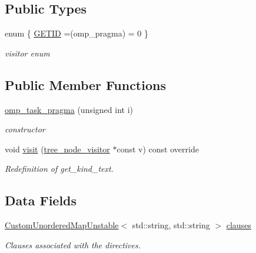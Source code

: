 \subsection*{Public Types}
\begin{DoxyCompactItemize}
\item 
enum \{ \hyperlink{structomp__task__pragma_a8ec24e09afe0ec62f8bfd7be080eebd5a942964266ed950c2659db67c807ab712}{G\+E\+T\+ID} =(omp\+\_\+pragma) = 0
 \}\begin{DoxyCompactList}\small\item\em visitor enum \end{DoxyCompactList}
\end{DoxyCompactItemize}
\subsection*{Public Member Functions}
\begin{DoxyCompactItemize}
\item 
\hyperlink{structomp__task__pragma_a7dc6713b8c01f0a80a90c083e3fe154a}{omp\+\_\+task\+\_\+pragma} (unsigned int i)
\begin{DoxyCompactList}\small\item\em constructor \end{DoxyCompactList}\item 
void \hyperlink{structomp__task__pragma_ad7ce2ba5852e3a4404ef8dad6c6034be}{visit} (\hyperlink{classtree__node__visitor}{tree\+\_\+node\+\_\+visitor} $\ast$const v) const override
\begin{DoxyCompactList}\small\item\em Redefinition of get\+\_\+kind\+\_\+text. \end{DoxyCompactList}\end{DoxyCompactItemize}
\subsection*{Data Fields}
\begin{DoxyCompactItemize}
\item 
\hyperlink{custom__map_8hpp_a8cbaceffc09790a885ec7e9c17809c69}{Custom\+Unordered\+Map\+Unstable}$<$ std\+::string, std\+::string $>$ \hyperlink{structomp__task__pragma_aa403449999fc8c28f6565bb87bfef116}{clauses}
\begin{DoxyCompactList}\small\item\em Clauses associated with the directives. \end{DoxyCompactList}\end{DoxyCompactItemize}
